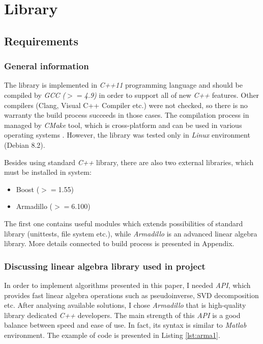 \chapter{Library}

\section{Requirements}

\subsection{General information}
The library is implemented in \textit{C++11} programming language and should be compiled by \textit{GCC ($>=$4.9)} in order to support all of new \textit{C++} features. Other compilers (Clang, Visual C++ Compiler etc.) were not checked, so there is no warranty the build process succeeds in those cases.  The compilation process in managed by \textit{CMake} tool, which is cross-platform and can be used in various operating systems \cite{CMake}. However, the library was tested only in \textit{Linux} environment (Debian 8.2). 

Besides using standard \textit{C++} library, there are also two external libraries, which must be installed in system: 

\begin{itemize}
    \item Boost ($>=$1.55)
    \item Armadillo ($>=$6.100)
\end{itemize}
The first one contains useful modules which extends possibilities of standard library (unittests, file system etc.), while \textit{Armadillo} is an advanced linear algebra library. More details connected to build process is presented in Appendix. 


\subsection{Discussing linear algebra library used in project}

In order to implement algorithms presented in this paper, I needed \textit{API}, which provides fast linear algebra operations such as pseudoinverse, SVD decomposition etc. After analysing available solutions, I chose \textit{Armadillo} that is high-quality library dedicated \textit{C++} developers. The main strength of this \textit{API} is a good balance between speed and ease of use. In fact, its syntax is similar to \textit{Matlab} environment. The example of code is presented in Listing \ref{lst:arma1}.

